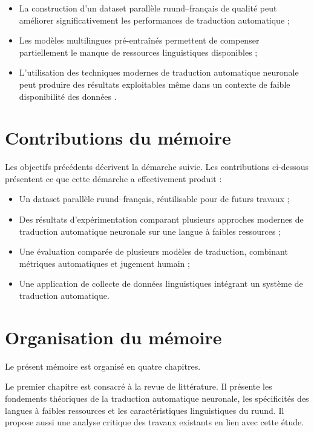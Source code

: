 \begin{itemize}
    \item La construction d'un dataset parallèle ruund--français de qualité peut améliorer significativement les performances de traduction automatique ;

    \item Les modèles multilingues pré-entraînés permettent de compenser partiellement le manque de ressources linguistiques disponibles ;

    \item L'utilisation des techniques modernes de traduction automatique neuronale peut produire des résultats exploitables même dans un contexte de faible disponibilité des données .
\end{itemize}

\section{Contributions du mémoire}

Les objectifs précédents décrivent la démarche suivie. Les contributions ci-dessous présentent ce que cette démarche a effectivement produit :

\begin{itemize}
    \item Un dataset parallèle ruund--français, réutilisable pour de futurs travaux ;

    \item Des résultats d'expérimentation comparant plusieurs approches modernes de traduction automatique neuronale sur une langue à faibles ressources ;

    \item Une évaluation comparée de plusieurs modèles de traduction, combinant métriques automatiques et jugement humain ;

    \item Une application de collecte de données linguistiques intégrant un système de traduction automatique.
\end{itemize}

\section{Organisation du mémoire}

Le présent mémoire est organisé en quatre chapitres.

Le premier chapitre est consacré à la revue de littérature. Il présente les fondements théoriques de la traduction automatique neuronale, les spécificités des langues à faibles ressources et les caractéristiques linguistiques du ruund. Il propose aussi une analyse critique des travaux existants en lien avec cette étude.

